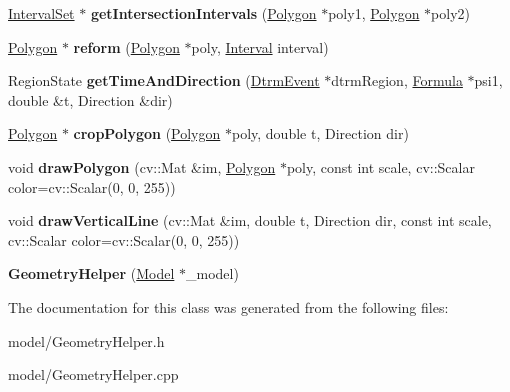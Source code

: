 \begin{DoxyCompactItemize}
\item 
\hypertarget{classGeometryHelper_a6098e903f0a208eb07d0c5d757a4f287}{\hyperlink{classIntervalSet}{Interval\-Set} $\ast$ {\bfseries get\-Intersection\-Intervals} (\hyperlink{classPolygon}{Polygon} $\ast$poly1, \hyperlink{classPolygon}{Polygon} $\ast$poly2)}\label{classGeometryHelper_a6098e903f0a208eb07d0c5d757a4f287}

\item 
\hypertarget{classGeometryHelper_ab841a9e5157551f92b258b35256fa47c}{\hyperlink{classPolygon}{Polygon} $\ast$ {\bfseries reform} (\hyperlink{classPolygon}{Polygon} $\ast$poly, \hyperlink{classInterval}{Interval} interval)}\label{classGeometryHelper_ab841a9e5157551f92b258b35256fa47c}

\item 
\hypertarget{classGeometryHelper_aef019beba9a3b2b53003547a827cf4a3}{Region\-State {\bfseries get\-Time\-And\-Direction} (\hyperlink{structDtrmEvent}{Dtrm\-Event} $\ast$dtrm\-Region, \hyperlink{classFormula}{Formula} $\ast$psi1, double \&t, Direction \&dir)}\label{classGeometryHelper_aef019beba9a3b2b53003547a827cf4a3}

\item 
\hypertarget{classGeometryHelper_aeeb237d9828716f45df0d448a8d7d38d}{\hyperlink{classPolygon}{Polygon} $\ast$ {\bfseries crop\-Polygon} (\hyperlink{classPolygon}{Polygon} $\ast$poly, double t, Direction dir)}\label{classGeometryHelper_aeeb237d9828716f45df0d448a8d7d38d}

\item 
\hypertarget{classGeometryHelper_a46ee0f2694f41ebbb0ceffc9b5400f85}{void {\bfseries draw\-Polygon} (cv\-::\-Mat \&im, \hyperlink{classPolygon}{Polygon} $\ast$poly, const int scale, cv\-::\-Scalar color=cv\-::\-Scalar(0, 0, 255))}\label{classGeometryHelper_a46ee0f2694f41ebbb0ceffc9b5400f85}

\item 
\hypertarget{classGeometryHelper_a6af9172d08359b747bb94d345a2147de}{void {\bfseries draw\-Vertical\-Line} (cv\-::\-Mat \&im, double t, Direction dir, const int scale, cv\-::\-Scalar color=cv\-::\-Scalar(0, 0, 255))}\label{classGeometryHelper_a6af9172d08359b747bb94d345a2147de}

\item 
\hypertarget{classGeometryHelper_aeaa993b44490ab75eea883230f246a47}{{\bfseries Geometry\-Helper} (\hyperlink{structModel}{Model} $\ast$\-\_\-model)}\label{classGeometryHelper_aeaa993b44490ab75eea883230f246a47}

\end{DoxyCompactItemize}


The documentation for this class was generated from the following files\-:\begin{DoxyCompactItemize}
\item 
model/Geometry\-Helper.\-h\item 
model/Geometry\-Helper.\-cpp\end{DoxyCompactItemize}
